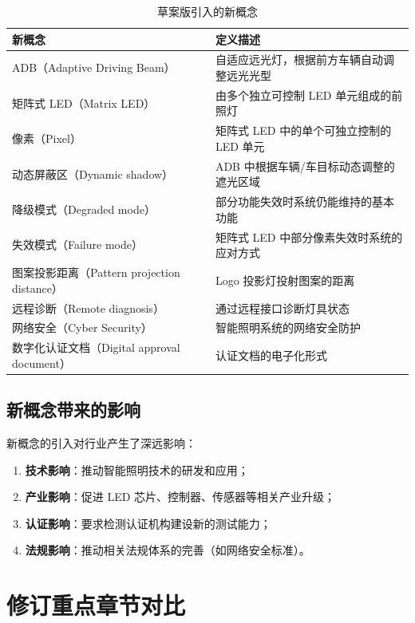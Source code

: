 \begin{table}[H]
\centering
\caption{草案版引入的新概念}
\small
\begin{tabularx}{\textwidth}{|l|X|}
\hline
\textbf{新概念} & \textbf{定义描述} \\
\hline
ADB（Adaptive Driving Beam） & 自适应远光灯，根据前方车辆自动调整远光光型 \\
\hline
矩阵式 LED（Matrix LED）   & 由多个独立可控制 LED 单元组成的前照灯 \\
\hline
像素（Pixel）            & 矩阵式 LED 中的单个可独立控制的 LED 单元 \\
\hline
动态屏蔽区（Dynamic shadow）& ADB 中根据车辆/车目标动态调整的遮光区域 \\
\hline
降级模式（Degraded mode）  & 部分功能失效时系统仍能维持的基本功能 \\
\hline
失效模式（Failure mode）   & 矩阵式 LED 中部分像素失效时系统的应对方式 \\
\hline
图案投影距离（Pattern projection distance）& Logo 投影灯投射图案的距离 \\
\hline
远程诊断（Remote diagnosis）& 通过远程接口诊断灯具状态 \\
\hline
网络安全（Cyber Security）& 智能照明系统的网络安全防护 \\
\hline
数字化认证文档（Digital approval document）& 认证文档的电子化形式 \\
\hline
\end{tabularx}
\end{table}

\subsection{新概念带来的影响}

新概念的引入对行业产生了深远影响：

\begin{enumerate}[leftmargin=2em]
    \item \textbf{技术影响}：推动智能照明技术的研发和应用；
    \item \textbf{产业影响}：促进 LED 芯片、控制器、传感器等相关产业升级；
    \item \textbf{认证影响}：要求检测认证机构建设新的测试能力；
    \item \textbf{法规影响}：推动相关法规体系的完善（如网络安全标准）。
\end{enumerate}

\section{修订重点章节对比}

